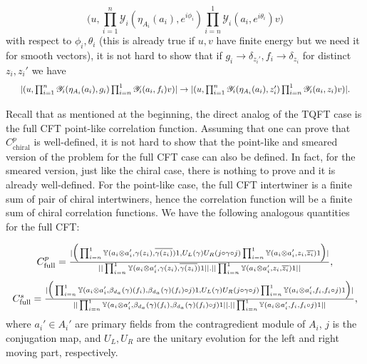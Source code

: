 \documentclass[twoside,11pt,titlepage]{amsart}
\renewcommand{\=}[1]{\stackrel{#1}{=}} %
\theoremstyle{definition}
\theoremstyle{remark}
\begin{document}
$$\Big(u,\prod_{i=1}^n\mathscr{Y}_i(\eta_{A_i}(a_i),e^{i\phi_i})\prod_{i=n}^1\mathscr{Y}_i(a_i,e^{i\theta_i})v\Big)$$
with respect to $\phi_i,\theta_i$ (this is already true if $u,v$ have finite energy but we need it for smooth vectors), it is not hard to show that if $g_i \to \delta_{z_i'},f_i\to \delta_{z_i}$ for distinct $z_i,z_i'$ we have 
\begin{gather*}
\scalebox{0.87}{$|(u,\prod_{i=1}^n\mathscr{Y}_i(\eta_{A_i}(a_i),g_i)\prod_{i=n}^1\mathscr{Y}_i(a_i,f_i)v)| \to |(u,\prod_{i=1}^n\mathscr{Y}_i(\eta_{A_i}(a_i),z_i')\prod_{i=n}^1\mathscr{Y}_i(a_i,z_i)v)|.$}
\end{gather*}

Recall that as mentioned at the beginning, the direct analog of the TQFT case is the full CFT point-like correlation function. Assuming that one can prove that $C_{\text{chiral}}^p$ is well-defined, it is not hard to show that the point-like and smeared version of the problem for the full CFT case can also be defined. In fact, for the smeared version, just like the chiral case, there is nothing to prove and it is already well-defined. For the point-like case, the full CFT intertwiner is a finite sum of pair of chiral intertwiners, hence the correlation function will be a finite sum of chiral correlation functions. We have the following analogous quantities for the full CFT:

\begin{gather*}
\scalebox{0.9999}{$C_{\text{full}}^p= \frac{|\Big(\prod_{i=n}^{1}\mathbb{Y}(a_i\otimes a_i',\gamma(z_i),\overline{\gamma({z_i})})1,U_L(\gamma) U_R(j \circ \gamma \circ j)\prod_{i=n}^{1}\mathbb{Y}(a_i\otimes a_i',z_i,\overline{z_i})1\Big)|}{||\prod_{i=n}^{1}\mathbb{Y}(a_i\otimes a_i',\gamma(z_i),\overline{\gamma({z_i})})1||.||\prod_{i=n}^{1}\mathbb{Y}(a_i\otimes a_i',z_i,\overline{z_i})1||},$}
\end{gather*}
\begin{gather*}
\scalebox{0.98}{$C_{\text{full}}^s= \frac{|\Big(\prod_{i=n}^{1}\mathbb{Y}(a_i\otimes a_i',\beta_{d_a}(\gamma)(f_i),\beta_{d_a}(\gamma)(f_i)\circ j)1,U_L(\gamma) U_R(j \circ \gamma \circ j)\prod_{i=n}^{1}\mathbb{Y}(a_i\otimes a_i',f_i,f_i\circ j)1\Big)|}{||\prod_{i=n}^{1}\mathbb{Y}(a_i\otimes a_i',\beta_{d_a}(\gamma)(f_i),\beta_{d_a}(\gamma)(f_i)\circ j)1||.||\prod_{i=n}^{1}\mathbb{Y}(a_i\otimes a_i',f_i,f_i\circ j)1||},$}
\end{gather*}
where $a_i' \in A_i'$ are primary fields from the contragredient module of $A_i$, $j$ is the conjugation map, and $U_L,U_R$ are the unitary evolution for the left and right moving part, respectively.
\end{document}
